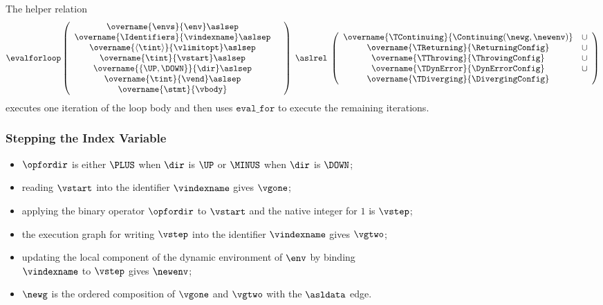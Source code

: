 \hypertarget{def-evalforloop}{}
The helper relation
\[
  \evalforloop\left(
    \begin{array}{cl}
    \overname{\envs}{\env} \aslsep &\\
    \overname{\Identifiers}{\vindexname} \aslsep &\\
    \overname{\langle\tint\rangle}{\vlimitopt} \aslsep &\\
    \overname{\tint}{\vstart} \aslsep &\\
    \overname{\{\UP,\DOWN\}}{\dir} \aslsep &\\
    \overname{\tint}{\vend} \aslsep &\\
    \overname{\stmt}{\vbody} &
    \end{array}
    \right) \;\aslrel\;
    \left(
    \begin{array}{cl}
    \overname{\TContinuing}{\Continuing(\newg, \newenv)} & \cup\\
    \overname{\TReturning}{\ReturningConfig} & \cup\\
    \overname{\TThrowing}{\ThrowingConfig} & \cup \\
    \overname{\TDynError}{\DynErrorConfig} & \cup\\
    \overname{\TDiverging}{\DivergingConfig} &
    \end{array}
    \right)
\]
executes one iteration of the loop body and then uses $\texttt{eval\_for}$ to execute the remaining
iterations.

\ProseParagraph
\subsubsection{Stepping the Index Variable}
\AllApply
\begin{itemize}
  \item $\opfordir$ is either $\PLUS$ when $\dir$ is $\UP$ or $\MINUS$ when $\dir$ is $\DOWN$;
  \item reading $\vstart$ into the identifier $\vindexname$ gives $\vgone$;
  \item applying the binary operator $\opfordir$ to $\vstart$ and the native integer for $1$ is $\vstep$;
  \item the execution graph for writing $\vstep$ into the identifier $\vindexname$ gives $\vgtwo$;
  \item updating the local component of the dynamic environment of $\env$ by binding \\ $\vindexname$ to $\vstep$
  gives $\newenv$;
  \item $\newg$ is the ordered composition of $\vgone$ and $\vgtwo$ with the $\asldata$ edge.
\end{itemize}

